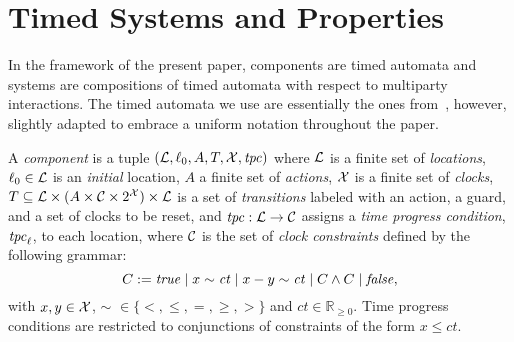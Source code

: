 \section{Timed Systems and Properties}
\label{sec2}

In the framework of the present paper, components are timed automata
and systems are compositions of timed automata with respect to
multiparty interactions. The timed automata we use are essentially
the ones from~\cite{alur94}, however, slightly adapted to embrace a
uniform notation throughout the paper.

\begin{definition}[Component]
  \label{def:atom}
  A \emph{component} is a tuple
  $(\mathcal{L}, \ell_0, A, T, \mathcal{X}, \mathit{tpc})$ where
  $\mathcal{L}$ is a finite set of \emph{locations}, $\ell_0 \in \mathcal{L}$ is an \emph{initial} location, $A$
  a finite set of \emph{actions}, $\mathcal{X}$ is a finite set of
  \emph{clocks}, $T \subseteq \mathcal{L}\times(A\times \mathcal{C}
  \times 2^{\mathcal{X}})\times \mathcal{L}$ is a set of \emph{transitions} labeled with an action, a
  guard, and a set of clocks to be reset,
  and $\mathit{tpc}: \mathcal{L}\rightarrow\mathcal{C}$ assigns a \emph{time
    progress condition}, $\mathit{tpc}_{\ell}$,
    to each location, where $\mathcal{C}$ is the set of \emph{clock
  constraints} defined by the following grammar: 
  \begin{displaymath} 
  C := \textnormal{\textit{true}} \mid x\sim\mathit{ct} \mid x - y \sim\mathit{ct} \mid C 
\wedge C\mid\textnormal{\textit{false}}, 
\end{displaymath}
  with $x, y\in \mathcal{X}$, $\sim$ $\in\{<,\le,=,\ge,>\}$ and $\mathit{ct} \in
  \mathbb{R}_{\ge 0}$.
 Time progress conditions are restricted to conjunctions of
  constraints of the form $x \leq \mathit{ct}$.
\end{definition}

